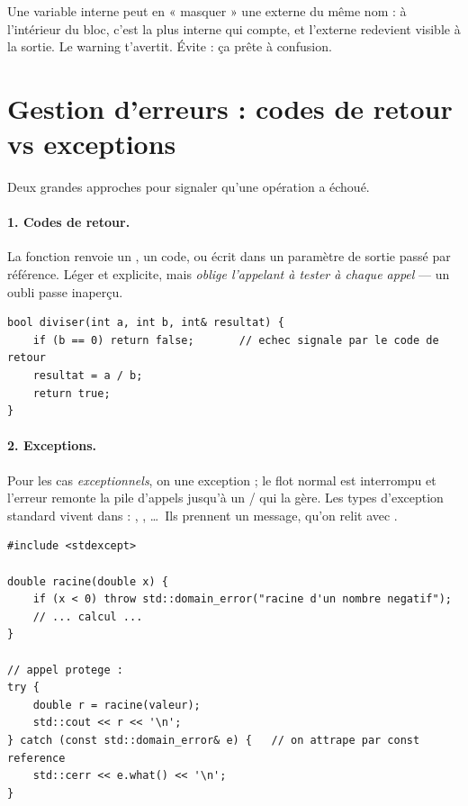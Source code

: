 \documentclass[11pt]{article}
\begin{document}
\begin{piege}[Shadowing]
Une variable interne peut en « masquer » une externe du même nom : à l'intérieur
du bloc, c'est la plus interne qui compte, et l'externe redevient visible à la
sortie. Le warning  t'avertit. Évite : ça prête à confusion.
\end{piege}

\section{Gestion d'erreurs : codes de retour vs exceptions}

Deux grandes approches pour signaler qu'une opération a échoué.

\paragraph{1. Codes de retour.} La fonction renvoie un , un code, ou
écrit dans un paramètre de sortie passé par référence. Léger et explicite, mais
\emph{oblige l'appelant à tester à chaque appel} — un oubli passe inaperçu.

\begin{lstlisting}
bool diviser(int a, int b, int& resultat) {
    if (b == 0) return false;       // echec signale par le code de retour
    resultat = a / b;
    return true;
}
\end{lstlisting}

\paragraph{2. Exceptions.} Pour les cas \emph{exceptionnels}, on 
une exception ; le flot normal est interrompu et l'erreur remonte la pile
d'appels jusqu'à un / qui la gère. Les types d'exception
standard vivent dans  : ,
, \ldots\ Ils prennent un
message, qu'on relit avec .

\begin{lstlisting}
#include <stdexcept>

double racine(double x) {
    if (x < 0) throw std::domain_error("racine d'un nombre negatif");
    // ... calcul ...
}

// appel protege :
try {
    double r = racine(valeur);
    std::cout << r << '\n';
} catch (const std::domain_error& e) {   // on attrape par const reference
    std::cerr << e.what() << '\n';
}
\end{lstlisting}
\end{document}
